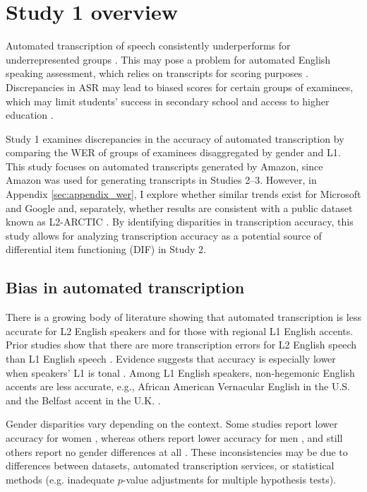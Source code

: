 \documentclass [PhD] {uclathes}
\begin{document}
\section{Study 1 overview}

Automated transcription of speech consistently underperforms for underrepresented groups \citep{dichristofano2023, hutiri2022}. This may pose a problem for automated English speaking assessment, which relies on transcripts for scoring purposes \citep{zechner2019automated, johnston2019using}. Discrepancies in ASR may lead to biased scores for certain groups of examinees, which may limit students' success in secondary school \citep{johnson2020} and access to higher education \citep{johnson2019effects}. 

Study 1 examines discrepancies in the accuracy of automated transcription by comparing the WER of groups of examinees disaggregated by gender and L1. This study focuses on automated transcripts generated by Amazon, since Amazon was used for generating transcripts in Studies 2–3. However, in Appendix \ref{sec:appendix_wer}, I explore whether similar trends exist for Microsoft and Google and, separately, whether results are consistent with a public dataset known as L2-ARCTIC \citep[Appendix \ref{sec:appendix_l2};][]{zhao2018l2}. By identifying disparities in transcription accuracy, this study allows for analyzing transcription accuracy as a potential source of differential item functioning (DIF) in Study 2.

\subsection{Bias in automated transcription}

There is a growing body of literature showing that automated transcription is less accurate for L2 English speakers and for those with regional L1 English accents. Prior studies show that there are more transcription errors for L2 English speech than L1 English speech \citep{dichristofano2023, markl2022, meyer2020}. Evidence suggests that accuracy is especially lower when speakers' L1 is tonal \citep{chan2022training}. Among L1 English speakers, non-hegemonic English accents are less accurate, e.g., African American Vernacular English in the U.S. \citep{koenecke2020} and the Belfast accent in the U.K. \citep{markl2022}.

Gender disparities vary depending on the context. Some studies report lower accuracy for women \citep{tatman2017a, hutiri2022}, whereas others report lower accuracy for men \citep{dichristofano2023, zuluaga2023, markl2022}, and still others report no gender differences at all \citep{chan2022training, tatman2017b}. These inconsistencies may be due to differences between datasets, automated transcription services, or statistical methods (e.g. inadequate $p$-value adjustments for multiple hypothesis tests).
\end{document}
